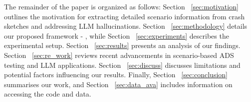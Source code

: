 \begin{itemize}
\end{itemize}

The remainder of the paper is organized as follows: Section ~\ref{sec:motivation} outlines the motivation for extracting detailed scenario information from crash sketches and addressing LLM hallucinations. Section ~\ref{sec:methodology} details our proposed framework - {\tool}, while Section ~\ref{sec:experiments} describes the experimental setup. Section ~\ref{sec:results} presents an analysis of our findings. Section ~\ref{sec:re_work} reviews recent advancements in scenario-based ADS testing and LLM applications. Section ~\ref{sec:discuss} discusses limitations and potential factors influencing our results. Finally, Section ~\ref{sec:conclusion} summarises our work, and Section ~\ref{sec:data_ava} includes information on accessing the code and data.
